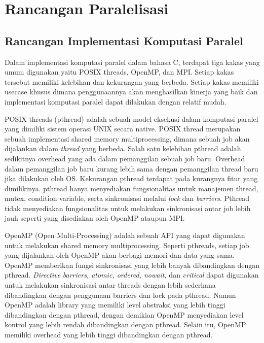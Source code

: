 
\section{Rancangan Paralelisasi}
  \subsection{Rancangan Implementasi Komputasi Paralel} \label{sec:parallel_env}

    Dalam implementasi komputasi paralel dalam bahasa C, terdapat tiga kakas yang umum digunakan yaitu POSIX threads, OpenMP, dan MPI. Setiap kakas tersebut memiliki kelebihan dan kekurangan yang berbeda. Setiap kakas memiliki usecase khusus dimana penggunaannya akan menghasilkan kinerja yang baik dan implementasi komputasi paralel dapat dilakukan dengan relatif mudah.

    POSIX threads (pthread) adalah sebuah model eksekusi dalam komputasi paralel yang dimiliki sistem operasi UNIX secara native. POSIX thread merupakan sebuah implementasi shared memory multiprocessing, dimana sebuah job akan dijalankan dalam \textit{thread} yang berbeda. Salah satu kelebihan pthread adalah sedikitnya overhead yang ada dalam pemanggilan sebuah job baru. Overhead dalam pemanggilan job baru kurang lebih sama dengan pemanggilan thread baru jika dilakukan oleh OS. Kekurangan pthread terdapat pada kurangnya fitur yang dimilikinya. pthread hanya menyediakan fungsionalitas untuk manajemen thread, mutex, condition variable, serta sinkronisasi melalui \textit{lock} dan \textit{barriers}. Pthread tidak menyediakan fungsionalitas untuk melakukan sinkronisasi antar job lebih jauh seperti yang disediakan oleh OpenMP ataupun MPI.

    OpenMP (Open Multi-Processing) adalah sebuah API yang dapat digunakan untuk melakukan shared memory multiprocessing. Seperti pthreads, setiap job yang dijalankan oleh OpenMP akan berbagi memori dan data yang sama. OpenMP memberikan fungsi sinkronisasi yang lebih banyak dibandingkan dengan pthread. \textit{Directive} \textit{barriers, atomic, ordered, nowait,} dan \textit{critical} dapat digunakan untuk melakukan sinkronisasi antar threads dengan lebih sederhana dibandingkan dengan penggunaan barriers dan lock pada pthread. Namun OpenMP adalah library yang memiliki level abstraksi yang lebih tinggi dibandingkan dengan pthread, dengan demikian OpenMP menyediakan level kontrol yang lebih rendah dibandingkan dengan pthread. Selain itu, OpenMP memiliki overhead yang lebih tinggi dibandingkan dengan pthread.

